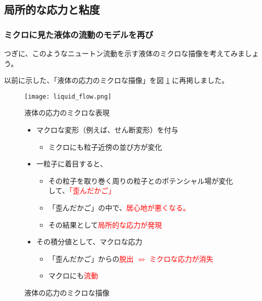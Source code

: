 \documentclass[uplatex,dvipdfmx,a4paper,11pt]{jsreport}
\begin{document}
\subsection{局所的な応力と粘度}

\subsubsection{ミクロに見た液体の流動のモデルを再び}

つぎに、このようなニュートン流動を示す液体のミクロな描像を考えてみましょう。

以前に示した、「液体の応力のミクロな描像」を図 \ref{fig:stress_micro} に再掲しました。
\begin{figure}[htb]
	\begin{center}
		\begin{minipage}{0.9\textwidth}
			\begin{center}
				\texttt{[image: liquid\_flow.png]}
			\end{center}
		\end{minipage}
		\begin{minipage}{0.9\textwidth}
			\begin{center}
				\begin{itembox}[l]{液体の応力のミクロな表現}
					\begin{itemize}
						\item マクロな変形（例えば、せん断変形）を付与
						\begin{itemize}
							\item ミクロにも粒子近傍の並び方が変化
						\end{itemize}
						\item 一粒子に着目すると、
						\begin{itemize}
							\item その粒子を取り巻く周りの粒子とのポテンシャル場が変化して、\textcolor{red}{「歪んだかご」}
							\item 「歪んだかご」の中で、\textcolor{red}{居心地が悪くなる。}
							\item その結果として\textcolor{red}{局所的な応力が発現}
						\end{itemize}
						\item その積分値として、マクロな応力
						\begin{itemize}
							\item 「歪んだかご」からの\textcolor{red}{脱出 $\Leftrightarrow$ ミクロな応力が消失 }
							\item マクロにも\textcolor{red}{流動}
						\end{itemize}
					\end{itemize}
				\end{itembox}
			\end{center}
		\end{minipage}
		\caption{液体の応力のミクロな描像}
		\label{fig:stress_micro}
	\end{center}
\end{figure}
\end{document}
